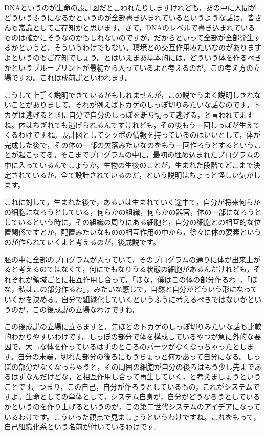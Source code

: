 \documentclass{ltjsbook}
\begin{document}
DNAというのが生命の設計図だと言われたりしますけれども，あの中に人間がどういうふうになるかというのが全部書き込まれているというような話は，皆さんも常識としてご存知かと思います。さて，DNAのレベルで書き込まれているものは確かにそうなのかもしれないのですが，だからといって全部が全部発生するかというと，そういうわけでもない。環境との交互作用みたいなのがありますよというのもご存知でしょう。とはいえまあ基本的には，どういう体を作るべきかというブループリントが最初から入っているよと考えるのが，この考え方の立場ですね。これは成前説といわれます。

こうして上手く説明できているかもしれませんが，この説でうまく説明しきれないことがありまして，それが例えばトカゲのしっぽ切りみたいな話なのです。トカゲは逃げるときに自分で自分のしっぽを断ち切って逃げる，と言われてますね。体はちぎれても逃げられるんですけれども，その後もう一回しっぽが生えてくるわけですね。設計図としてシッポの情報を持っているのはいいとして，体が完成した後で，その体の一部の欠落みたいなのをもう一回作ろうとするということが起こってる。そこまでプログラムの中に，最初の埋め込まれたプログラムの中に入っているんでしょうか。生物の生後のことが，生まれた段階でどこまで決定されているか，全て設計されているのだ，という説明はちょっと怪しい気がします。

これに対して，生まれた後で，あるいは生まれていく途中で，自分が将来何らかの細胞になろうとしている，何らかの組織，何らかの器官，体の一部になろうとしているという時に，その組織の周りにある細胞と，自分の細胞との相互的な位置関係ですとか，配置みたいなものの相互作用の中から，徐々に体の要素というのが作られていくよと考えるのが，後成説です。

胚の中に全部のプログラムが入っていて，そのプログラムの通りに体が出来上がると考えるのではなくて，何にでもなりうる状態の細胞があるんだけれども，それぞれが領域ごとに相互作用し合って，「ほな，僕はこの体の部分作るわ」，「ほな，私はこの部分作るわ」，みたいな感じで，自然と自分がどういう形になっていくかを決める。自分で組織化していくというふうに考えるべきではないかというのが，この後成説の立場なわけですね。

この後成説の立場に立ちますと，先ほどのトカゲのしっぽ切りみたいな話も比較的わかりやすいわけです。しっぽの部分で体を構成しているやつが急に外的な要因で，大事な体を作っているはずのところのパーツがなくなっちゃったとします。自分の末端，切れた部分の後ろにもうちょっと何かあって自分になる。しっぽの部分がなくなっちゃうと，その周囲の細胞が自分の後ろはもう少し先まであるはずなんだけどな，と相互作用し合って再生していく，と考えましょうということです。つまり，この自己，自分が作ろうとしているもの，これがシステムですよ。生命としての単体として，システム自身が，自分がどうなろうとしているかというのを作り上げるというのが，この第二世代システムのアイデアになっているわけです。こういった観点で見ましょうというわけですね。これをもって，自己組織化系という名前が付いているわけです。
\end{document}
